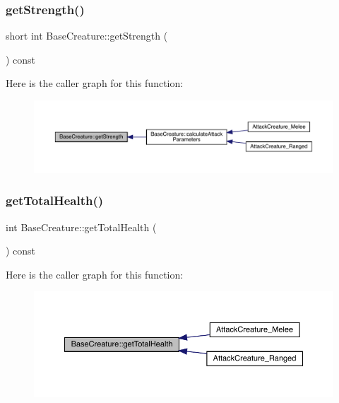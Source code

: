 \subsubsection{\texorpdfstring{get\+Strength()}{getStrength()}}
{\footnotesize\ttfamily short int Base\+Creature\+::get\+Strength (\begin{DoxyParamCaption}{ }\end{DoxyParamCaption}) const}

Here is the caller graph for this function\+:
\nopagebreak
\begin{figure}[H]
\begin{center}
\leavevmode
\includegraphics[width=350pt]{class_base_creature_a1232a2ecb3199fe79627df912078f24e_icgraph}
\end{center}
\end{figure}
\mbox{\label{class_base_creature_accab7a878eae0580476b282ce2c556d3}} 
\subsubsection{\texorpdfstring{get\+Total\+Health()}{getTotalHealth()}}
{\footnotesize\ttfamily int Base\+Creature\+::get\+Total\+Health (\begin{DoxyParamCaption}{ }\end{DoxyParamCaption}) const}

Here is the caller graph for this function\+:
\nopagebreak
\begin{figure}[H]
\begin{center}
\leavevmode
\includegraphics[width=350pt]{class_base_creature_accab7a878eae0580476b282ce2c556d3_icgraph}
\end{center}
\end{figure}
\mbox{\label{class_base_creature_a8a960bc7a7689f5633b1abaa82fa6e95}} 
